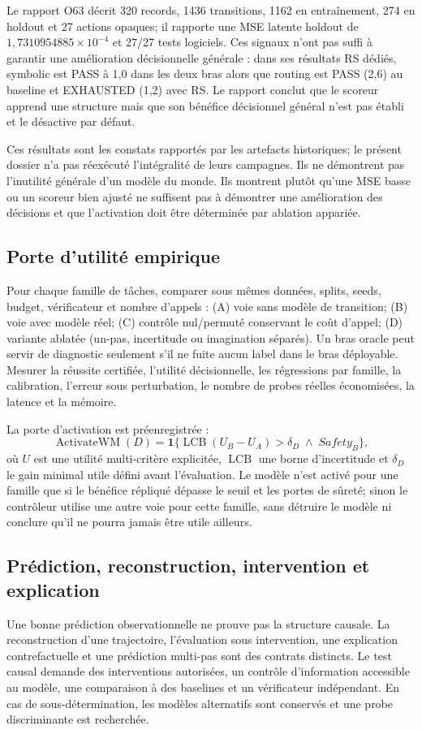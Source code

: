 \documentclass[11pt,a4paper]{article}
\begin{document}
Le rapport O63 décrit 320 records, 1436 transitions, 1162 en entraînement, 274 en holdout et 27 actions opaques; il rapporte une MSE latente holdout de \(1{,}7310954885\times10^{-4}\) et 27/27 tests logiciels. Ces signaux n'ont pas suffi à garantir une amélioration décisionnelle générale : dans ses résultats RS dédiés, symbolic est PASS à 1,0 dans les deux bras alors que routing est PASS (2,6) au baseline et EXHAUSTED (1,2) avec RS. Le rapport conclut que le scoreur apprend une structure mais que son bénéfice décisionnel général n'est pas établi et le désactive par défaut.

Ces résultats sont les constats rapportés par les artefacts historiques; le présent dossier n'a pas réexécuté l'intégralité de leurs campagnes. Ils ne démontrent pas l'inutilité générale d'un modèle du monde. Ils montrent plutôt qu'une MSE basse ou un scoreur bien ajusté ne suffisent pas à démontrer une amélioration des décisions et que l'activation doit être déterminée par ablation appariée.

\subsection{Porte d'utilité empirique}
Pour chaque famille de tâches, comparer sous mêmes données, splits, seeds, budget, vérificateur et nombre d'appels : (A) voie sans modèle de transition; (B) voie avec modèle réel; (C) contrôle nul/permuté conservant le coût d'appel; (D) variante ablatée (un-pas, incertitude ou imagination séparés). Un bras oracle peut servir de diagnostic seulement s'il ne fuite aucun label dans le bras déployable. Mesurer la réussite certifiée, l'utilité décisionnelle, les régressions par famille, la calibration, l'erreur sous perturbation, le nombre de probes réelles économisées, la latence et la mémoire.

La porte d'activation est préenregistrée :
\[
\operatorname{ActivateWM}(D)=\mathbf{1}\{\operatorname{LCB}(U_B-U_A)>\delta_D\;\land\;Safety_B\},
\]
où \(U\) est une utilité multi-critère explicitée, \(\operatorname{LCB}\) une borne d'incertitude et \(\delta_D\) le gain minimal utile défini avant l'évaluation. Le modèle n'est activé pour une famille que si le bénéfice répliqué dépasse le seuil et les portes de sûreté; sinon le contrôleur utilise une autre voie pour cette famille, sans détruire le modèle ni conclure qu'il ne pourra jamais être utile ailleurs.

\subsection{Prédiction, reconstruction, intervention et explication}
Une bonne prédiction observationnelle ne prouve pas la structure causale. La reconstruction d'une trajectoire, l'évaluation sous intervention, une explication contrefactuelle et une prédiction multi-pas sont des contrats distincts. Le test causal demande des interventions autorisées, un contrôle d'information accessible au modèle, une comparaison à des baselines et un vérificateur indépendant. En cas de sous-détermination, les modèles alternatifs sont conservés et une probe discriminante est recherchée.
\end{document}
